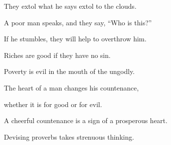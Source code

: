 {\par }{\QB They extol what he says extol to the clouds.
\par }{\Q A poor man speaks, and they say, “Who is this?”
\par }{\QB If he stumbles, they will help to overthrow him.
\par }{\BB \par }{\Q {}Riches are good if they have no sin.
\par }{\QB Poverty is evil in the mouth of the ungodly.
\par }{\Q {}The heart of a man changes his countenance,
\par }{\QB whether it is for good or for evil.
\par }{\Q {}A cheerful countenance is a sign of a prosperous heart.
\par }{\QB Devising proverbs takes strenuous thinking.

}
